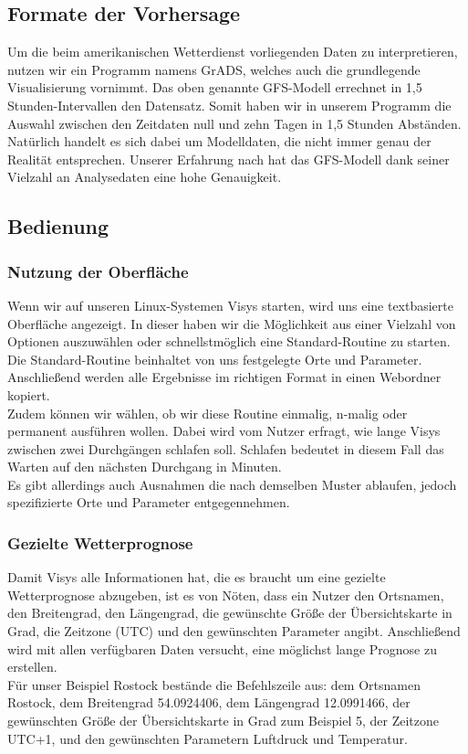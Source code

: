 \documentclass[a4paper,oneside,12pt,titlepage]{article}
\begin{document}
        \subsection{Formate der Vorhersage}
            Um die beim amerikanischen Wetterdienst vorliegenden Daten zu interpretieren, nutzen wir ein Programm namens GrADS, welches auch die grundlegende Visualisierung vornimmt. Das oben genannte GFS-Modell errechnet in 1,5 Stunden-Intervallen den Datensatz. Somit haben wir in unserem Programm die Auswahl zwischen den Zeitdaten null und zehn Tagen in 1,5 Stunden Abständen. Natürlich handelt es sich dabei um Modelldaten, die nicht immer genau der Realität entsprechen. Unserer Erfahrung nach hat das GFS-Modell dank seiner Vielzahl an Analysedaten eine hohe Genauigkeit.
    \subsection{Bedienung}
        \subsubsection{Nutzung der Oberfläche}
            Wenn wir auf unseren Linux-Systemen Visys starten, wird uns eine textbasierte Oberfläche angezeigt. In dieser haben wir die Möglichkeit aus einer Vielzahl von Optionen auszuwählen oder schnellstmöglich eine Standard-Routine zu starten. Die Standard-Routine beinhaltet von uns festgelegte Orte und Parameter. Anschließend werden alle Ergebnisse im richtigen Format in einen Webordner kopiert.\\ Zudem können wir wählen, ob wir diese Routine einmalig, n-malig oder permanent ausführen wollen. Dabei wird vom Nutzer erfragt, wie lange Visys zwischen zwei Durchgängen schlafen soll. Schlafen bedeutet in diesem Fall das Warten auf den nächsten Durchgang in Minuten. \\Es gibt allerdings auch Ausnahmen die nach demselben Muster ablaufen, jedoch spezifizierte Orte und Parameter entgegennehmen.

        \subsubsection{Gezielte Wetterprognose}
            Damit Visys alle Informationen hat, die es braucht um eine gezielte Wetterprognose abzugeben, ist es von Nöten, dass ein Nutzer den Ortsnamen, den Breitengrad, den Längengrad, die gewünschte Größe der Übersichtskarte in Grad, die Zeitzone (UTC) und den gewünschten Parameter angibt. Anschließend wird mit allen verfügbaren Daten versucht, eine möglichst lange Prognose zu erstellen. \\Für unser Beispiel Rostock bestände die Befehlszeile aus: dem Ortsnamen Rostock, dem Breitengrad 54.0924406, dem Längengrad 12.0991466, der gewünschten Größe der Übersichtskarte in Grad zum Beispiel 5, der Zeitzone UTC+1, und den gewünschten Parametern Luftdruck und Temperatur.
\end{document}
